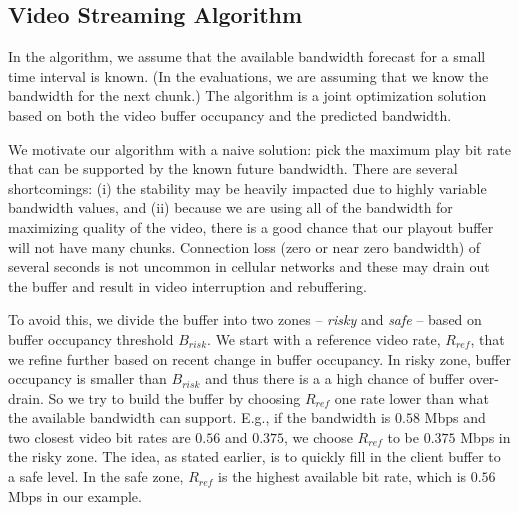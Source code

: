 \subsection{Video Streaming Algorithm} \label{subsec:online}

In the algorithm, we assume that the available bandwidth forecast for
a small time interval is known.
(In the evaluations, we are assuming that we know the bandwidth for
the next chunk.)
The algorithm is a joint optimization
solution based on both the video buffer occupancy and the predicted bandwidth. 


We motivate our algorithm with a naive solution: pick the maximum
 play bit rate that can be supported by the known future bandwidth. 
There are several shortcomings: (i) the stability may be heavily
impacted due to highly variable bandwidth values, and (ii)
because we are using all of the bandwidth for maximizing quality of
the video, there is a good chance that our playout buffer will not
have many chunks. 
Connection loss (zero or near zero bandwidth) of several seconds is
not uncommon in  cellular networks and these may drain out the buffer
and result in video interruption and rebuffering.

To avoid this, we divide the
buffer into two zones -- \emph{risky} and \emph{safe} -- based on
buffer occupancy 
threshold $B_{risk} $. 
We start with a reference video rate, $R_{ref}$, that we refine
further based on recent change in buffer occupancy.
In risky zone, buffer occupancy is smaller than
$B_{risk}$ and thus there is a
a high chance of buffer over-drain. So we try to build the buffer by
choosing $R_{ref}$ one rate lower than what the available bandwidth
can support. 
E.g., if the bandwidth is $0.58$ Mbps and two closest video
bit rates are $0.56$ and $0.375$, we choose $R_{ref}$ to be $ 0.375$
Mbps in the risky zone. 
The idea, as stated earlier, is to quickly 
fill in the client buffer to a safe level.
In the safe zone,  $R_{ref}$ is the highest available bit rate, which
is $0.56$ Mbps in our 
example. 

